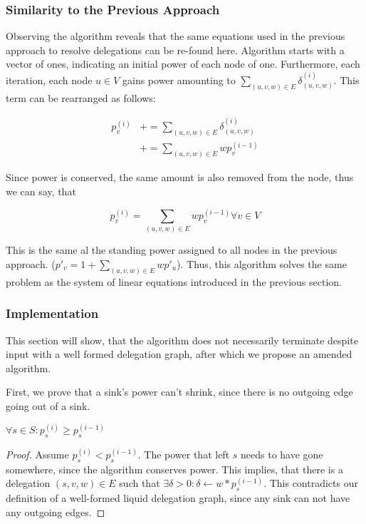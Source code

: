 \subsubsection{Similarity to the Previous Approach}

Observing the algorithm reveals that the same equations used in the previous approach to resolve delegations can be re-found here. Algorithm starts with a vector of ones, indicating an initial power of each node of one. Furthermore, each iteration, each node $u \in V$ gains power amounting to $\sum_{(u, v, w) \in E} \delta^{(i)}_{(u, v, w)}$. This term can be rearranged as follows:

\begin{align*}
p_v^{(i)} &+= \sum_{(u, v, w) \in E} \delta^{(i)}_{(u, v, w)} \\
&+= \sum_{(u, v, w) \in E} wp_v^{(i-1)}
\end{align*}

Since power is conserved, the same amount is also removed from the node, thus we can say, that

\[
p_v^{(i)} = \sum_{(u, v, w) \in E} wp_v^{(i-1)} \forall v \in V
\]


This is the same al the standing power assigned to all nodes in the previous approach. ($p'_v = 1 + \sum_{(u, v, w) \in E} wp'_u$). Thus, this algorithm solves the same problem as the system of linear equations introduced in the previous section. 


\subsubsection{Implementation}

This section will show, that the algorithm does not necessarily terminate despite input with a well formed delegation graph, after which we propose an amended algorithm.

First, we prove that a sink's power can't shrink, since there is no outgoing edge going out of a sink.

\begin{lemma}\label{lem:sink_non_shrink}
$\forall s \in S: p_s^{(i)} \ge p_s^{(i-1)}$ 
\end{lemma}
\begin{proof}
Assume $p_s^{(i)} < p_s^{(i-1)}$. The power that left $s$ needs to have gone somewhere, since the algorithm conserves power. This implies, that there is a delegation $(s, v, w) \in E$ such that $\exists \delta > 0: \delta \gets w * p_s^{(i-1)}$. This contradicts our definition of a well-formed liquid delegation graph, since any sink can not have any outgoing edges.
\end{proof}

